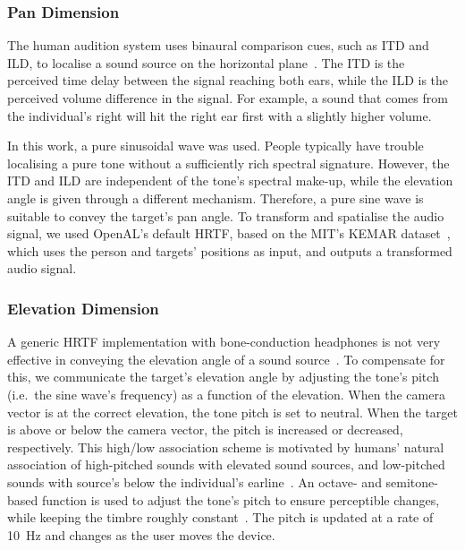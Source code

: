 \documentclass[]{interact}
\begin{document}
\subsubsection{Pan Dimension}

The human audition system uses binaural comparison cues, such as ITD and ILD, to localise a sound source on the horizontal plane~\citep{blauert1969sound}.
The ITD is the perceived time delay between the signal reaching both ears, while the ILD is the perceived volume difference in the signal.
For example, a sound that comes from the individual's right will hit the right ear first with a slightly higher volume.

In this work, a pure sinusoidal wave was used. 
People typically have trouble localising a pure tone without a sufficiently rich spectral signature.
However, the ITD and ILD are independent of the tone's spectral make-up, while the elevation angle is given through a different mechanism. Therefore, a pure sine wave is suitable to convey the target's pan angle.
To transform and spatialise the audio signal, we used OpenAL's default HRTF, based on the MIT's KEMAR dataset~\citep{hiebert2005openal}, which uses the person and targets' positions as input, and outputs a transformed audio signal.

\subsubsection{Elevation Dimension}

A generic HRTF implementation with bone-conduction headphones is not very effective in conveying the elevation angle of a sound source~\citep{macdonald2006spatial,schonstein2008comparison}.
To compensate for this, we communicate the target's elevation angle by adjusting the tone's pitch (i.e.\ the sine wave's frequency) as a function of the elevation. 
When the camera vector is at the correct elevation, the tone pitch is set to neutral.
When the target is above or below the camera vector, the pitch is increased or decreased, respectively.
This high/low association scheme is motivated by humans' natural association of high-pitched sounds with elevated sound sources, and low-pitched sounds with source's below the individual's earline~\citep{pratt1930spatial,blauert1997spatial}.
An octave- and semitone-based function is used to adjust the tone's pitch to ensure perceptible changes, while keeping the timbre roughly constant~\citep{shepard1964circularity}.
The pitch is updated at a rate of \SI{10}{\hertz} and changes as the user moves the device.
\end{document}
